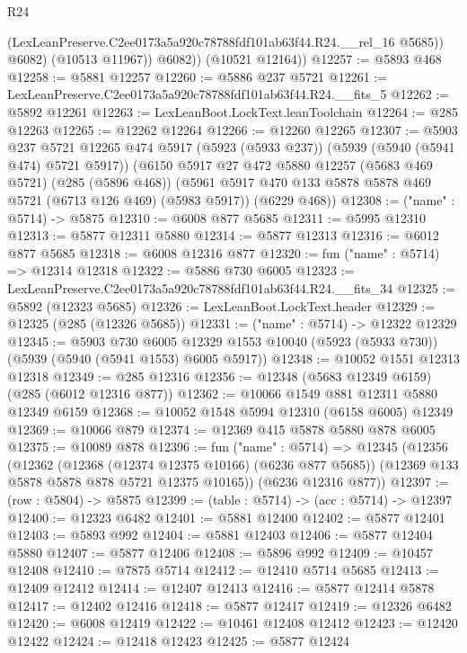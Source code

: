 \begin{lexlean}{R24}
\begin{coremodule}
                (LexLeanPreserve.C2ee0173a5a920c78788fdf101ab63f44.R24.__rel_16 @5685))
              @6082)
            (@10513 @11967))
          @6082))
      (@10521 @12164))
@12257 := @5893 @468
@12258 := @5881 @12257
@12260 := @5886 @237 @5721
@12261 := LexLeanPreserve.C2ee0173a5a920c78788fdf101ab63f44.R24.__fits_5
@12262 := @5892 @12261
@12263 := LexLeanBoot.LockText.leanToolchain
@12264 := @285 @12263
@12265 := @12262 @12264
@12266 := @12260 @12265
@12307 := @5903
    @237
    @5721
    @12265
    @474
    @5917
    (@5923 (@5933 @237))
    (@5939 (@5940 (@5941 @474) @5721 @5917))
    (@6150
      @5917
      @27
      @472
      @5880
      @12257
      (@5683 @469 @5721)
      (@285 (@5896 @468))
      (@5961 @5917 @470 @133 @5878 @5878 @469 @5721 (@6713 @126 @469) (@5983 @5917))
      (@6229 @468))
@12308 := ("name" : @5714) -> @5875
@12310 := @6008 @877 @5685
@12311 := @5995 @12310
@12313 := @5877 @12311 @5880
@12314 := @5877 @12313
@12316 := @6012 @877 @5685
@12318 := @6008 @12316 @877
@12320 := fun ("name" : @5714) => @12314 @12318
@12322 := @5886 @730 @6005
@12323 := LexLeanPreserve.C2ee0173a5a920c78788fdf101ab63f44.R24.__fits_34
@12325 := @5892 (@12323 @5685)
@12326 := LexLeanBoot.LockText.header
@12329 := @12325 (@285 (@12326 @5685))
@12331 := ("name" : @5714) -> @12322 @12329
@12345 := @5903
    @730
    @6005
    @12329
    @1553
    @10040
    (@5923 (@5933 @730))
    (@5939 (@5940 (@5941 @1553) @6005 @5917))
@12348 := @10052 @1551 @12313 @12318
@12349 := @285 @12316
@12356 := @12348 (@5683 @12349 @6159) (@285 (@6012 @12316 @877))
@12362 := @10066 @1549 @881 @12311 @5880 @12349 @6159
@12368 := @10052 @1548 @5994 @12310 (@6158 @6005) @12349
@12369 := @10066 @879
@12374 := @12369 @415 @5878 @5880 @878 @6005
@12375 := @10089 @878
@12396 := fun ("name" : @5714) =>
  @12345
    (@12356
      (@12362
        (@12368 (@12374 @12375 @10166) (@6236 @877 @5685))
        (@12369 @133 @5878 @5878 @878 @5721 @12375 @10165))
      (@6236 @12316 @877))
@12397 := (row : @5804) -> @5875
@12399 := (table : @5714) -> (acc : @5714) -> @12397
@12400 := @12323 @6482
@12401 := @5881 @12400
@12402 := @5877 @12401
@12403 := @5893 @992
@12404 := @5881 @12403
@12406 := @5877 @12404 @5880
@12407 := @5877 @12406
@12408 := @5896 @992
@12409 := @10457 @12408
@12410 := @7875 @5714
@12412 := @12410 @5714 @5685
@12413 := @12409 @12412
@12414 := @12407 @12413
@12416 := @5877 @12414 @5878
@12417 := @12402 @12416
@12418 := @5877 @12417
@12419 := @12326 @6482
@12420 := @6008 @12419
@12422 := @10461 @12408 @12412
@12423 := @12420 @12422
@12424 := @12418 @12423
@12425 := @5877 @12424

\end{coremodule}
\end{lexlean}
